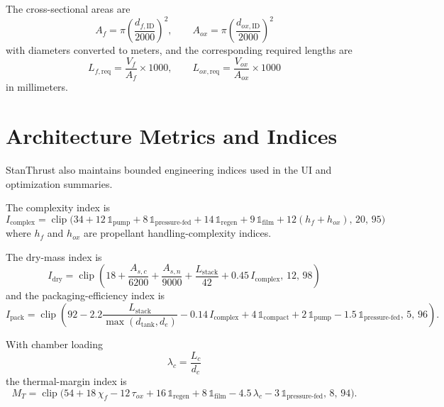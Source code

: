 \documentclass[11pt]{article}
\newcommand{\clip}{\operatorname{clip}}
\begin{document}
The cross-sectional areas are
\begin{equation}
A_f=\pi\left(\frac{d_{f,\text{ID}}}{2000}\right)^2,
\qquad
A_{ox}=\pi\left(\frac{d_{ox,\text{ID}}}{2000}\right)^2
\label{eq:tank-areas}
\end{equation}
with diameters converted to meters, and the corresponding required lengths are
\begin{equation}
L_{f,\text{req}}=\frac{V_f}{A_f}\times 1000,
\qquad
L_{ox,\text{req}}=\frac{V_{ox}}{A_{ox}}\times 1000
\label{eq:tank-req-length}
\end{equation}
in millimeters.

\section{Architecture Metrics and Indices}
StanThrust also maintains bounded engineering indices used in the UI and optimization summaries.

The complexity index is
\begin{equation}
I_{\text{complex}}
=
\clip\!\Big(
34
+12\,\mathbb{1}_{\text{pump}}
+8\,\mathbb{1}_{\text{pressure-fed}}
+14\,\mathbb{1}_{\text{regen}}
+9\,\mathbb{1}_{\text{film}}
+12(h_f+h_{ox}),
\,
20,\,
95
\Big)
\label{eq:complexity}
\end{equation}
where $h_f$ and $h_{ox}$ are propellant handling-complexity indices.

The dry-mass index is
\begin{equation}
I_{\text{dry}}
=
\clip\!\left(
18+\frac{A_{s,c}}{6200}+\frac{A_{s,n}}{9000}+\frac{L_{\text{stack}}}{42}+0.45\,I_{\text{complex}},
\,
12,\,
98
\right)
\label{eq:dry-mass}
\end{equation}
and the packaging-efficiency index is
\begin{equation}
I_{\text{pack}}
=
\clip\!\left(
92
-2.2\frac{L_{\text{stack}}}{\max(d_{\text{tank}},d_e)}
-0.14\,I_{\text{complex}}
+4\,\mathbb{1}_{\text{compact}}
+2\,\mathbb{1}_{\text{pump}}
-1.5\,\mathbb{1}_{\text{pressure-fed}},
\,
5,\,
96
\right).
\label{eq:packaging}
\end{equation}

With chamber loading
\begin{equation}
\lambda_c=\frac{L_c}{d_c}
\label{eq:chamber-loading}
\end{equation}
the thermal-margin index is
\begin{equation}
M_T
=
\clip\!\Big(
54
+18\,\chi_f
-12\,\tau_{ox}
+16\,\mathbb{1}_{\text{regen}}
+8\,\mathbb{1}_{\text{film}}
-4.5\,\lambda_c
-3\,\mathbb{1}_{\text{pressure-fed}},
\,
8,\,
94
\Big).
\label{eq:thermal-margin}
\end{equation}
\end{document}
